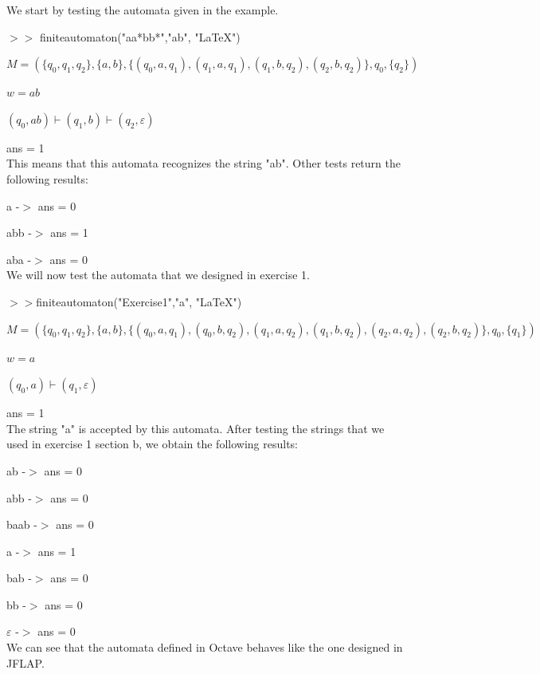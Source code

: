 \documentclass[fleqn, 10pt]{article}
\theoremstyle{plain}
\theoremstyle{definition}
\begin{document}
We start by testing the automata given in the example.

$>>$ finiteautomaton("aa*bb*","ab", "LaTeX")

$M = (\{q_0, q_1, q_2\}, \{a, b\}, \{(q_0, a, q_1), (q_1, a, q_1), (q_1, b, q_2), (q_2, b, q_2)\}, q_0, \{q_2\})$

$w = ab$

$(q_0, ab) \vdash (q_1, b) \vdash (q_2, \varepsilon)$

ans = 1
\\

This means that this automata recognizes the string "ab". Other tests return the following results:

a -$>$ ans = 0

abb -$>$ ans = 1

aba -$>$ ans = 0
\\

We will now test the automata that we designed in exercise 1.

$>>$finiteautomaton("Exercise1","a", "LaTeX")

$M = (\{q_0, q_1, q_2\}, \{a, b\}, \{(q_0, a, q_1), (q_0, b, q_2), (q_1, a, q_2), (q_1, b, q_2), (q_2, a, q_2), (q_2, b, q_2)\}, q_0, \{q_1\})$

$w = a$

$(q_0, a) \vdash (q_1, \varepsilon)$

ans = 1
\\

The string "a" is accepted by this automata. After testing the strings that we used in exercise 1 section b, we obtain the following results:

ab -$>$ ans = 0

abb -$>$ ans = 0

baab -$>$ ans = 0

a -$>$ ans = 1

bab -$>$ ans = 0

bb -$>$ ans = 0

$\varepsilon$ -$>$ ans = 0
\\

We can see that the automata defined in Octave behaves like the one designed in JFLAP.
\end{document}
